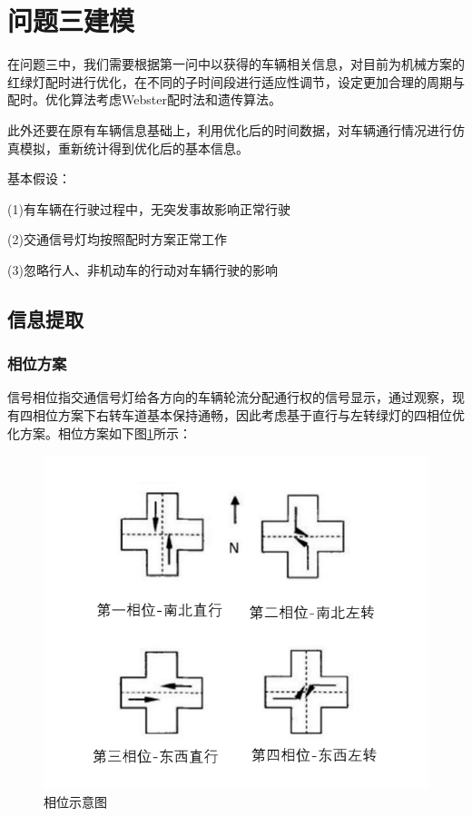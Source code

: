 \section{问题三建模}
在问题三中，我们需要根据第一问中以获得的车辆相关信息，对目前为机械方案的红绿灯配时进行优化，在不同的子时间段进行适应性调节，设定更加合理的周期与配时。优化算法考虑Webster配时法和遗传算法。

此外还要在原有车辆信息基础上，利用优化后的时间数据，对车辆通行情况进行仿真模拟，重新统计得到优化后的基本信息。

基本假设：

(1)有车辆在行驶过程中，无突发事故影响正常行驶

(2)交通信号灯均按照配时方案正常工作

(3)忽略行人、非机动车的行动对车辆行驶的影响

\subsection{信息提取}

\subsubsection{相位方案}
信号相位指交通信号灯给各方向的车辆轮流分配通行权的信号显示，通过观察，现有四相位方案下右转车道基本保持通畅，因此考虑基于直行与左转绿灯的四相位优化方案。相位方案如下图\ref{fig:相位}所示：
\begin{figure}[h]
    \centering
    \includegraphics[scale=0.5]{figures/四相相位图.png}
    \caption{相位示意图}
    \label{fig:相位}
\end{figure}

